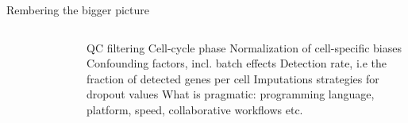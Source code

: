 \documentclass{beamer}\usepackage[]{graphicx}\usepackage[]{color}
\begin{document}
\begin{frame}
\begin{block}{Rembering the bigger picture}

\begin{columns}
\begin{center}
\begin{figure}
\includegraphics[height=6cm]{Images/Stegle-2015-workflow}
\caption{\cite{Stegle2015}}
\end{figure}
\end{center}


\scriptsize
QC filtering \newline \newline
Cell-cycle phase \newline \newline
Normalization of cell-specific biases \newline \newline
Confounding factors, incl. batch effects \newline \newline
Detection rate, i.e the fraction of detected genes per cell \newline \newline
Imputations strategies for dropout values  \newline \newline \newline
What is pragmatic: programming language, platform, speed, collaborative workflows etc.
\end{columns}
\end{block}
\end{frame}
\end{document}

